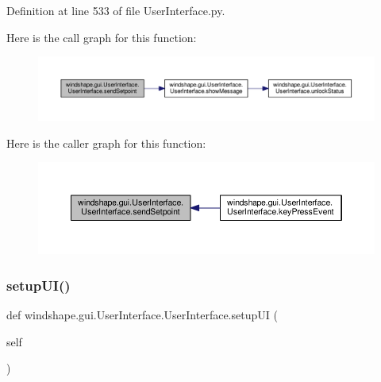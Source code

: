 Definition at line 533 of file User\+Interface.\+py.

Here is the call graph for this function\+:\nopagebreak
\begin{figure}[H]
\begin{center}
\leavevmode
\includegraphics[width=350pt]{classwindshape_1_1gui_1_1_user_interface_1_1_user_interface_ae1b487f3e6f38aa3429588bb885ef2d7_cgraph}
\end{center}
\end{figure}
Here is the caller graph for this function\+:\nopagebreak
\begin{figure}[H]
\begin{center}
\leavevmode
\includegraphics[width=350pt]{classwindshape_1_1gui_1_1_user_interface_1_1_user_interface_ae1b487f3e6f38aa3429588bb885ef2d7_icgraph}
\end{center}
\end{figure}
\mbox{\label{classwindshape_1_1gui_1_1_user_interface_1_1_user_interface_a9dea15485fadb638f05e21898ff642a0}} 
\subsubsection{\texorpdfstring{setup\+U\+I()}{setupUI()}}
{\footnotesize\ttfamily def windshape.\+gui.\+User\+Interface.\+User\+Interface.\+setup\+UI (\begin{DoxyParamCaption}\item[{}]{self }\end{DoxyParamCaption})}

